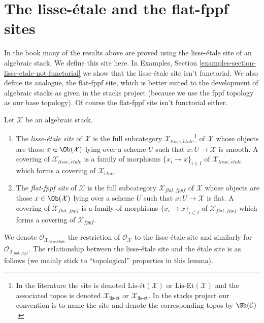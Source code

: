 \section{The lisse-\'etale and the flat-fppf sites}
\label{section-lisse-etale}

\noindent
In the book \cite{LM-B} many of the results above are proved using the
lisse-\'etale site of an algebraic stack. We define this site here.
In Examples, Section \ref{examples-section-lisse-etale-not-functorial}
we show that the lisse-\'etale site isn't functorial.
We also define its analogue, the flat-fppf site, which is better suited
to the development of algebraic stacks as given in the stacks project
(because we use the fppf topology as our base topology). Of course the
flat-fppf site isn't functorial either.

\begin{definition}
\label{definition-lisse-etale}
Let $\mathcal{X}$ be an algebraic stack.
\begin{enumerate}
\item The {\it lisse-\'etale site} of $\mathcal{X}$ is the full subcategory
$\mathcal{X}_{lisse,\acute{e}tale}$\footnote{In the literature the
site is denoted $\text{Lis-\'et}(\mathcal{X})$ or
$\text{Lis-Et}(\mathcal{X})$ and the associated topos is denoted
$\mathcal{X}_{\text{lis-\'e}t}$ or $\mathcal{X}_{\text{lis-et}}$.
In the stacks project our convention is to name the site and
denote the corresponding topos by $\Sh(\mathcal{C})$.} of $\mathcal{X}$
whose objects are those $x \in \Ob(\mathcal{X})$ lying over a scheme $U$
such that $x : U \to \mathcal{X}$ is smooth. A covering of
$\mathcal{X}_{lisse,\acute{e}tale}$ is a family of morphisms
$\{x_i \to x\}_{i \in I}$ of $\mathcal{X}_{lisse,\acute{e}tale}$
which forms a covering of $\mathcal{X}_{\acute{e}tale}$.
\item The {\it flat-fppf site} of $\mathcal{X}$ is the full subcategory
$\mathcal{X}_{flat,fppf}$ of $\mathcal{X}$
whose objects are those $x \in \Ob(\mathcal{X})$ lying over a scheme $U$
such that $x : U \to \mathcal{X}$ is flat. A covering of
$\mathcal{X}_{flat,fppf}$ is a family of morphisms
$\{x_i \to x\}_{i \in I}$ of $\mathcal{X}_{flat,fppf}$
which forms a covering of $\mathcal{X}_{fppf}$.
\end{enumerate}
\end{definition}

\noindent
We denote $\mathcal{O}_{\mathcal{X}_{lisse,\acute{e}tale}}$
the restriction of $\mathcal{O}_\mathcal{X}$ to the lisse-\'etale site
and similarly for $\mathcal{O}_{\mathcal{X}_{flat,fppf}}$.
The relationship between the lisse-\'etale site and the \'etale site is
as follows (we mainly stick to ``topological'' properties in this lemma).

